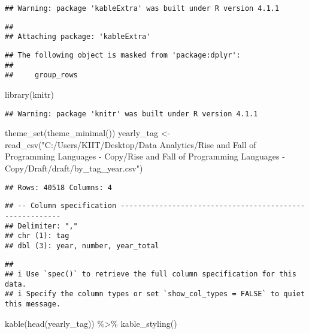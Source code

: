 \documentclass[
]{article}
\newenvironment{Shaded}{\begin{snugshade}}{\end{snugshade}}
\newcommand{\FunctionTok}[1]{\textcolor[rgb]{0.00,0.00,0.00}{#1}}
\newcommand{\NormalTok}[1]{#1}
\newcommand{\OtherTok}[1]{\textcolor[rgb]{0.56,0.35,0.01}{#1}}
\newcommand{\SpecialCharTok}[1]{\textcolor[rgb]{0.00,0.00,0.00}{#1}}
\newcommand{\StringTok}[1]{\textcolor[rgb]{0.31,0.60,0.02}{#1}}
\begin{document}
\begin{verbatim}
## Warning: package 'kableExtra' was built under R version 4.1.1
\end{verbatim}

\begin{verbatim}
## 
## Attaching package: 'kableExtra'
\end{verbatim}

\begin{verbatim}
## The following object is masked from 'package:dplyr':
## 
##     group_rows
\end{verbatim}

\begin{Shaded}
\begin{Highlighting}[]
\FunctionTok{library}\NormalTok{(knitr)}
\end{Highlighting}
\end{Shaded}

\begin{verbatim}
## Warning: package 'knitr' was built under R version 4.1.1
\end{verbatim}

\begin{Shaded}
\begin{Highlighting}[]
\FunctionTok{theme\_set}\NormalTok{(}\FunctionTok{theme\_minimal}\NormalTok{())}
\NormalTok{yearly\_tag }\OtherTok{\textless{}{-}} \FunctionTok{read\_csv}\NormalTok{(}\StringTok{"C:/Users/KIIT/Desktop/Data Analytics/Rise and Fall of Programming Languages {-} Copy/Rise and Fall of Programming Languages {-} Copy/Draft/draft/by\_tag\_year.csv"}\NormalTok{)}
\end{Highlighting}
\end{Shaded}

\begin{verbatim}
## Rows: 40518 Columns: 4
\end{verbatim}

\begin{verbatim}
## -- Column specification --------------------------------------------------------
## Delimiter: ","
## chr (1): tag
## dbl (3): year, number, year_total
\end{verbatim}

\begin{verbatim}
## 
## i Use `spec()` to retrieve the full column specification for this data.
## i Specify the column types or set `show_col_types = FALSE` to quiet this message.
\end{verbatim}

\begin{Shaded}
\begin{Highlighting}[]
\FunctionTok{kable}\NormalTok{(}\FunctionTok{head}\NormalTok{(yearly\_tag)) }\SpecialCharTok{\%\textgreater{}\%} 
  \FunctionTok{kable\_styling}\NormalTok{()}
\end{Highlighting}
\end{Shaded}
\end{document}
